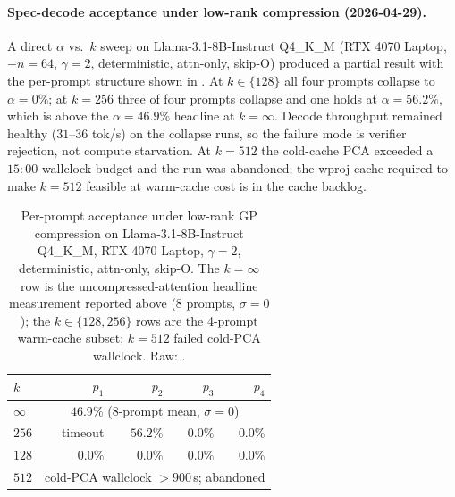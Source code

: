 \documentclass[11pt]{article}
\begin{document}
\paragraph{Spec-decode acceptance under low-rank compression
(2026-04-29).}  A direct $\alpha$ vs.\ $k$ sweep on Llama-3.1-8B-Instruct
Q4\_K\_M (RTX 4070 Laptop, $-n{=}64$, $\gamma{=}2$, deterministic, attn-only,
skip-O) produced a partial result with the per-prompt structure shown in
. At $k{\in}\{128\}$ all four prompts collapse
to $\alpha{=}0\%$; at $k{=}256$ three of four prompts collapse and one
holds at $\alpha{=}56.2\%$, which is above the $\alpha{=}46.9\%$ headline
at $k{=}\infty$. Decode throughput remained healthy ($31$--$36$ tok/s)
on the collapse runs, so the failure mode is verifier rejection, not
compute starvation. At $k{=}512$ the cold-cache PCA exceeded a
$15{:}00$ wallclock budget and the run was abandoned; the wproj cache
required to make $k{=}512$ feasible at warm-cache cost is in the cache
backlog.

\begin{table}[h]\centering\small
\caption{Per-prompt acceptance under low-rank GP compression on
Llama-3.1-8B-Instruct Q4\_K\_M, RTX 4070 Laptop, $\gamma{=}2$,
deterministic, attn-only, skip-O. The $k{=}\infty$ row is the
uncompressed-attention headline measurement reported above
(8 prompts, $\sigma{=}0$); the $k{\in}\{128, 256\}$ rows are the
4-prompt warm-cache subset; $k{=}512$ failed cold-PCA wallclock.
Raw: .}
\label{tab:accept-collapse}
\begin{tabular}{@{}lrrrr@{}}
\toprule
$k$ & $p_1$ & $p_2$ & $p_3$ & $p_4$ \\
\midrule
$\infty$ & \multicolumn{4}{c}{$46.9\%$ (8-prompt mean, $\sigma{=}0$)} \\
$256$ & timeout & $\mathbf{56.2\%}$ & $0.0\%$ & $0.0\%$ \\
$128$ & $0.0\%$ & $0.0\%$ & $0.0\%$ & $0.0\%$ \\
$512$ & \multicolumn{4}{c}{cold-PCA wallclock $>900$\,s; abandoned} \\
\bottomrule
\end{tabular}
\end{table}
\end{document}
